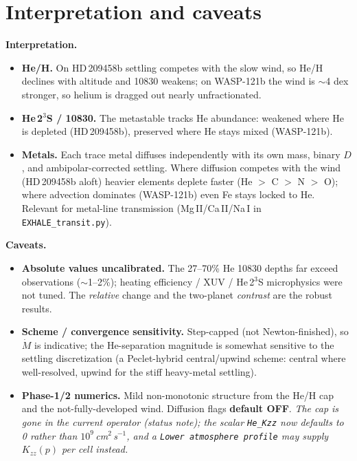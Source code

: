 \documentclass{my_memo}
\newcommand{\Mdot}{\dot{M}}
\begin{document}
\clearpage
\section{Interpretation and caveats}

\textbf{Interpretation.}
\begin{itemize}
  \item \textbf{He/H.} On HD\,209458b settling competes with the slow wind, so He/H declines
    with altitude and 10830 weakens; on WASP-121b the wind is $\sim$4 dex stronger, so helium
    is dragged out nearly unfractionated.
  \item \textbf{He\,2$^3$S / 10830.} The metastable tracks He abundance: weakened where He
    is depleted (HD\,209458b), preserved where He stays mixed (WASP-121b).
  \item \textbf{Metals.} Each trace metal diffuses independently with its own mass, binary
    $D$, and ambipolar-corrected settling. Where diffusion competes with the wind
    (HD\,209458b aloft) heavier elements deplete faster (He $>$ C $>$ N $>$ O); where
    advection dominates (WASP-121b) even Fe stays locked to He. Relevant for metal-line
    transmission (Mg\,II/Ca\,II/Na\,I in \texttt{EXHALE\_transit.py}).
\end{itemize}

\textbf{Caveats.}
\begin{itemize}
  \item \textbf{Absolute values uncalibrated.} The 27--70\% He 10830 depths far exceed
    observations ($\sim$1--2\%); heating efficiency / XUV / He\,2$^3$S microphysics were not
    tuned. The \emph{relative} change and the two-planet \emph{contrast} are the robust
    results.
  \item \textbf{Scheme / convergence sensitivity.} Step-capped (not Newton-finished), so
    $\Mdot$ is indicative; the He-separation magnitude is somewhat sensitive to the settling
    discretization (a Peclet-hybrid central/upwind scheme: central where well-resolved, upwind
    for the stiff heavy-metal settling).
  \item \textbf{Phase-1/2 numerics.} Mild non-monotonic structure from the He/H cap and the
    not-fully-developed wind. Diffusion
    flags \textbf{default OFF}. \emph{The cap is gone in the current operator (status
    note); the scalar \texttt{He\_Kzz} now defaults to 0 rather than
    $10^{9}$\,cm$^{2}$\,s$^{-1}$, and a \texttt{Lower atmosphere profile} may supply
    $K_{zz}(p)$ per cell instead.}
\end{itemize}
\end{document}
